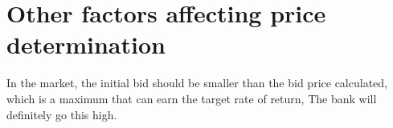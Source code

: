 





\section{Other factors affecting price determination}
In the market, the initial bid should be smaller than the bid price calculated, which is a maximum that can earn the target rate of return, The bank will definitely go this high. 


